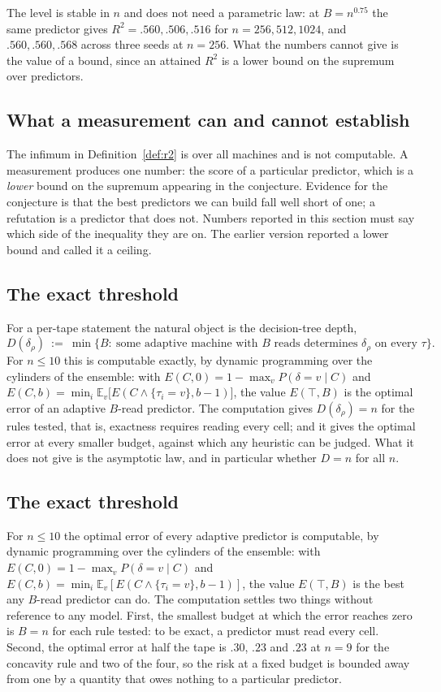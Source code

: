 \documentclass[11pt]{article}
\begin{document}
The level is stable in $n$ and does not need a parametric law: at $B=n^{0.75}$ the same
predictor gives $R^2=.560,.506,.516$ for $n=256,512,1024$, and $.560,.560,.568$ across three
seeds at $n=256$. What the numbers cannot give is the value of a bound, since an attained
$R^2$ is a lower bound on the supremum over predictors.

\subsection{What a measurement can and cannot establish}

The infimum in Definition~\ref{def:r2} is over all machines and is not computable. A
measurement produces one number: the score of a particular predictor, which is a
\emph{lower} bound on the supremum appearing in the conjecture. Evidence for the conjecture
is that the best predictors we can build fall well short of one; a refutation is a predictor
that does not. Numbers reported in this section must say which side of the inequality they
are on. The earlier version reported a lower bound and called it a ceiling.

\subsection{The exact threshold}

For a per-tape statement the natural object is the decision-tree depth,
\[
D(\delta_\rho)\ :=\ \min\{B:\ \text{some adaptive machine with }B\text{ reads determines }
\delta_\rho\text{ on every }\tau\}.
\]
For $n\le 10$ this is computable exactly, by dynamic programming over the cylinders of the
ensemble: with $E(C,0)=1-\max_v P(\delta=v\mid C)$ and
$E(C,b)=\min_i \mathbb E_v\big[E(C\wedge\{\tau_i=v\},b-1)\big]$, the value $E(\top,B)$ is the
optimal error of an adaptive $B$-read predictor. The computation gives $D(\delta_\rho)=n$ for
the rules tested, that is, exactness requires reading every cell; and it gives the optimal
error at every smaller budget, against which any heuristic can be judged. What it does not
give is the asymptotic law, and in particular whether $D=n$ for all $n$.

\subsection{The exact threshold}

For $n\le 10$ the optimal error of every adaptive predictor is computable, by dynamic
programming over the cylinders of the ensemble: with $E(C,0)=1-\max_v P(\delta=v\mid C)$ and
$E(C,b)=\min_i\mathbb E_v[E(C\wedge\{\tau_i=v\},b-1)]$, the value $E(\top,B)$ is the best any
$B$-read predictor can do. The computation settles two things without reference to any model.
First, the smallest budget at which the error reaches zero is $B=n$ for each rule tested: to
be exact, a predictor must read every cell. Second, the optimal error at half the tape is
$.30$, $.23$ and $.23$ at $n=9$ for the concavity rule and two of the four, so the risk at a
fixed budget is bounded away from one by a quantity that owes nothing to a particular
predictor.
\end{document}
